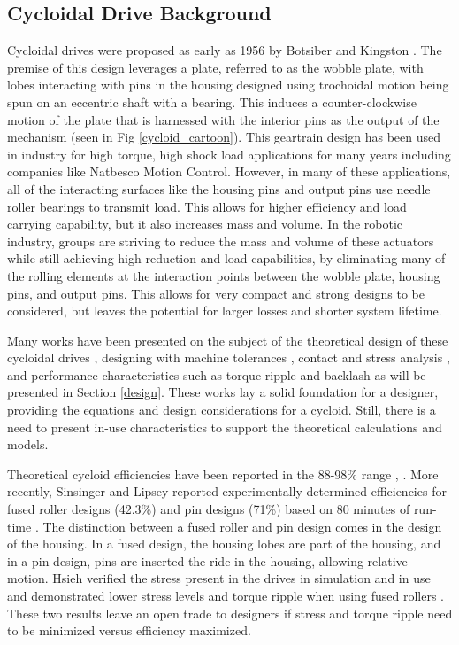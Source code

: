 \subsection{Cycloidal Drive Background}
Cycloidal drives were proposed as early as 1956 by Botsiber and Kingston \cite{1956}. The premise of this design leverages a plate, referred to as the wobble plate, with lobes interacting with pins in the housing designed using trochoidal motion being spun on an eccentric shaft with a bearing. This induces a counter-clockwise motion of the plate that is harnessed with the interior pins as the output of the mechanism (seen in Fig \ref{cycloid_cartoon}). This geartrain design has been used in industry for high torque, high shock load applications for many years including companies like Natbesco Motion Control. However, in many of these applications, all of the interacting surfaces like the housing pins and output pins use needle roller bearings to transmit load. This allows for higher efficiency and load carrying capability, but it also increases mass and volume. In the robotic industry, groups are striving to reduce the mass and volume of these actuators while still achieving  high reduction and load capabilities, by eliminating many of the rolling elements at the interaction points between the wobble plate, housing pins, and output pins. This allows for very compact and strong designs to be considered, but leaves the potential for larger losses and shorter system lifetime. 

Many works have been presented on the subject of the theoretical design of these cycloidal drives \cite{on_the_lobe} \cite{hwang_hsieh}, designing with machine tolerances \cite{design_and_application}, contact and stress analysis \cite{li}, and performance characteristics such as torque ripple and backlash \cite{hsieh_traditional} \cite{hsieh_dynamics} as will be presented in Section \ref{design}. These works lay a solid foundation for a designer, providing the equations and design considerations for a cycloid. Still, there is a need to present in-use characteristics to support the theoretical calculations and models. 

Theoretical cycloid efficiencies have been reported in the 88-98\% range \cite{Malhorta}, \cite{unified_approach}. More recently, Sinsinger and Lipsey reported experimentally determined efficiencies for fused roller designs (42.3\%) and pin designs (71\%) based on 80 minutes of run-time \cite{cycloid_vs_harmonic}. The distinction between a fused roller and pin design comes in the design of the housing. In a fused design, the housing lobes are part of the housing, and in a pin design, pins are inserted the ride in the housing, allowing relative motion. 
Hsieh verified the stress present in the drives in simulation and in use and demonstrated lower stress levels and torque ripple when using fused rollers \cite{hsieh_dynamics}. 
These two results leave an open trade to designers if stress and torque ripple need to be minimized versus efficiency maximized.

